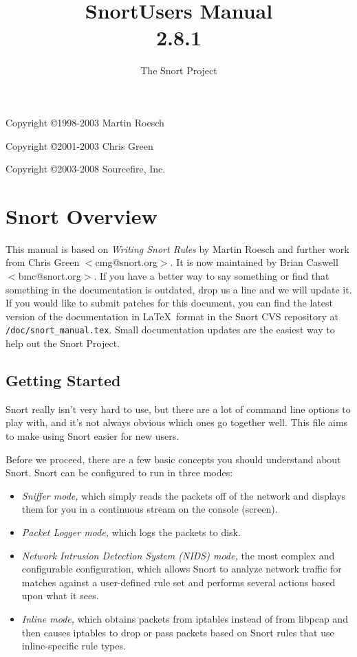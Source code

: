 \documentclass[english]{report}
\begin{document}
\title{Snort\texttrademark  Users Manual\\  2.8.1 }

\author{The Snort Project}

\maketitle

\newpage

Copyright \copyright 1998-2003 Martin Roesch

Copyright \copyright 2001-2003 Chris Green

Copyright \copyright 2003-2008 Sourcefire, Inc.

\tableofcontents{}


\chapter{Snort Overview}

This manual is based on \emph{Writing Snort Rules} by Martin Roesch and further
work from Chris Green $<$cmg@snort.org$>$.  It is now maintained by Brian
Caswell $<$bmc@snort.org$>$.  If you have a better way to say something or find
that something in the documentation is outdated, drop us a line and we will
update it.  If you would like to submit patches for this document, you can find
the latest version of the documentation in \LaTeX\ format in the Snort CVS
repository at \verb!/doc/snort_manual.tex!.  Small documentation updates are
the easiest way to help out the Snort Project.

\section{Getting Started}

Snort really isn't very hard to use, but there are a lot of command line
options to play with, and it's not always obvious which ones go together well.
This file aims to make using Snort easier for new users.

Before we proceed, there are a few basic concepts you should understand about
Snort. Snort can be configured to run in three modes:
\begin{itemize}
\item {\em Sniffer mode,} which simply reads the packets off of the network and displays them 
for you in a continuous stream on the console (screen). 
\item {\em Packet Logger mode,} which logs the packets to disk. 
\item {\em Network Intrusion Detection System (NIDS) mode,} the most complex and configurable configuration,
which allows Snort to analyze network traffic for matches against a user-defined
rule set and performs several actions based upon what it sees.
\item {\em Inline mode,} which obtains packets from iptables instead of from libpcap and then
causes iptables to drop or pass packets based on Snort rules that use inline-specific rule types.
\end{itemize}
\end{document}
